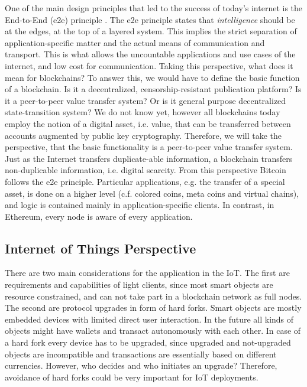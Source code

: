 One of the main design principles that led to the success of today's internet is the End-to-End (e2e) principle \parencite{Saltzer:1984:EAS:357401.357402}. The e2e principle states that \emph{intelligence} should be at the edges, at the top of a layered system. This implies the strict separation of application-specific matter and the actual means of communication and transport. This is what allows the uncountable applications and use cases of the internet, and low cost for communication. Taking this perspective, what does it mean for blockchains? To answer this, we would have to define the basic function of a blockchain. Is it a decentralized, censorship-resistant publication platform? Is it a peer-to-peer value transfer system? Or is it general purpose decentralized state-transition system? We do not know yet, however all blockchains today employ the notion of a digital asset, i.e. value, that can be transferred between accounts augmented by public key cryptography. Therefore, we will take the perspective, that the basic functionality is a peer-to-peer value transfer system. Just as the Internet transfers duplicate-able information, a blockchain transfers non-duplicable information, i.e. digital scarcity. From this perspective Bitcoin follows the e2e principle. Particular applications, e.g. the transfer of a special asset, is done on a higher level (c.f. colored coins, meta coins and virtual chains), and logic is contained mainly in application-specific clients. In contrast, in Ethereum, every node is aware of every application.



\subsection{Internet of Things Perspective}

There are two main considerations for the application in the IoT. The first are requirements and capabilities of light clients, since most smart objects are resource constrained, and can not take part in a blockchain network as full nodes. The second are protocol upgrades in form of hard forks. Smart objects are mostly embedded devices with limited direct user interaction. In the future all kinds of objects might have wallets and transact autonomously with each other. In case of a hard fork every device has to be upgraded, since upgraded and not-upgraded objects are incompatible and transactions are essentially based on different currencies. However, who decides and who initiates an upgrade? Therefore, avoidance of hard forks could be very important for IoT deployments.


